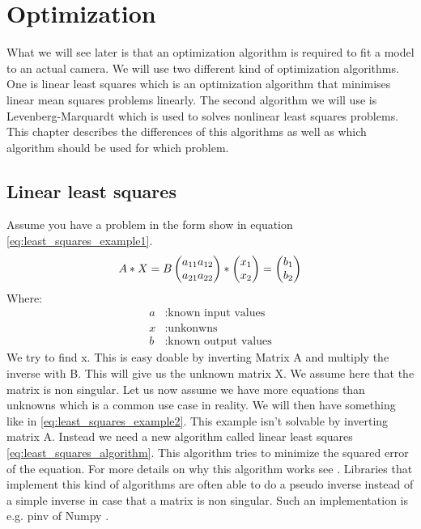 \documentclass[11pt,a4paper,titlepage,oneside]{report}
\begin{document}
\section{Optimization}
What we will see later is that an optimization algorithm is required to fit a model to an actual camera. We will use two different kind of optimization algorithms. One is linear least squares which is an optimization algorithm that minimises linear mean squares problems linearly. The second algorithm we will use is Levenberg-Marquardt which is used to solves nonlinear least squares problems. This chapter describes the differences of this algorithms as well as which algorithm should be used for which problem.

\subsection{Linear least squares}
Assume you have a problem in the form show in equation \ref{eq:least_squares_example1}.
\begin{equation}\label{eq:least_squares_example1}
  A*X=B \\ 
  \begin{pmatrix}
    a_{11} a_{12} \\
    a_{21} a_{22}
  \end{pmatrix}*
  \begin{pmatrix}
    x_1 \\
    x_2
  \end{pmatrix}=
  \begin{pmatrix}
    b_1 \\
    b_2
  \end{pmatrix}
\end{equation}
Where:
\begin{align*}
  a		  &: \text{known input values}\\
  x	  	&: \text{unkonwns}\\
  b		  &: \text{known output values}
\end{align*}
We try to find x. This is easy doable by inverting Matrix A and multiply the inverse with B. This will give us the unknown matrix X. We assume here that the matrix is non singular. Let us now assume we have more equations than unknowns which is a common use case in reality. We will then have something like in \ref{eq:least_squares_example2}. This example isn't solvable by inverting matrix A. Instead we need a new algorithm called linear least squares \ref{eq:least_squares_algorithm}. This algorithm tries to minimize the squared error of the equation. For more details on why this algorithm works see \cite{Monson}. Libraries that implement this kind of algorithms are often able to do a pseudo inverse instead of a simple inverse in case that a matrix is non singular. Such an implementation is e.g. pinv of Numpy \cite{pinv}.
\end{document}
